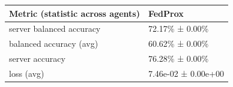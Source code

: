 \begin{tabular}{ll}
\hline
 Metric (statistic across agents)   & FedProx             \\
\hline
 server balanced accuracy           & 72.17\% ± 0.00\%      \\
 balanced accuracy (avg)            & 60.62\% ± 0.00\%      \\
 server accuracy                    & 76.28\% ± 0.00\%      \\
 loss (avg)                         & 7.46e-02 ± 0.00e+00 \\
\hline
\end{tabular}
